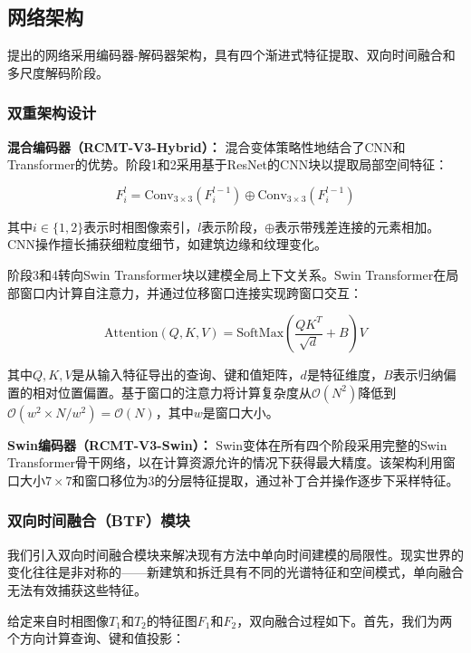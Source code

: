 \documentclass[journal]{IEEEtran}
\begin{document}
\subsection{网络架构}

提出的网络采用编码器-解码器架构，具有四个渐进式特征提取、双向时间融合和多尺度解码阶段。

\subsubsection{双重架构设计}

\textbf{混合编码器（RCMT-V3-Hybrid）：} 混合变体策略性地结合了CNN和Transformer的优势。阶段1和2采用基于ResNet的CNN块以提取局部空间特征：

\begin{equation}
F_i^l = \text{Conv}_{3\times 3}(F_{i}^{l-1}) \oplus \text{Conv}_{3\times 3}(F_{i}^{l-1})
\label{eq:cnn}
\end{equation}

其中$i \in \{1,2\}$表示时相图像索引，$l$表示阶段，$\oplus$表示带残差连接的元素相加。CNN操作擅长捕获细粒度细节，如建筑边缘和纹理变化。

阶段3和4转向Swin Transformer块以建模全局上下文关系。Swin Transformer在局部窗口内计算自注意力，并通过位移窗口连接实现跨窗口交互：

\begin{equation}
\text{Attention}(Q, K, V) = \text{SoftMax}\left(\frac{QK^T}{\sqrt{d}} + B\right)V
\label{eq:attention}
\end{equation}

其中$Q, K, V$是从输入特征导出的查询、键和值矩阵，$d$是特征维度，$B$表示归纳偏置的相对位置偏置。基于窗口的注意力将计算复杂度从$\mathcal{O}(N^2)$降低到$\mathcal{O}(w^2 \times N/w^2) = \mathcal{O}(N)$，其中$w$是窗口大小。

\textbf{Swin编码器（RCMT-V3-Swin）：} Swin变体在所有四个阶段采用完整的Swin Transformer骨干网络，以在计算资源允许的情况下获得最大精度。该架构利用窗口大小$7 \times 7$和窗口移位为3的分层特征提取，通过补丁合并操作逐步下采样特征。

\subsubsection{双向时间融合（BTF）模块}

我们引入双向时间融合模块来解决现有方法中单向时间建模的局限性。现实世界的变化往往是非对称的——新建筑和拆迁具有不同的光谱特征和空间模式，单向融合无法有效捕获这些特征。

给定来自时相图像$T_1$和$T_2$的特征图$F_1$和$F_2$，双向融合过程如下。首先，我们为两个方向计算查询、键和值投影：
\end{document}

